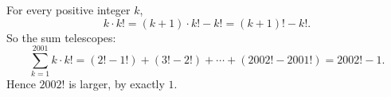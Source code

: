 For every positive integer $k$,
\[k\cdot k!=(k+1)\cdot k!-k!=(k+1)!-k!.\]
So the sum telescopes:
\[\sum_{k=1}^{2001}k\cdot k!=(2!-1!)+(3!-2!)+\cdots+(2002!-2001!)=2002!-1 .\]
Hence $\boxed{2002!}$ is larger, by exactly $1$.
